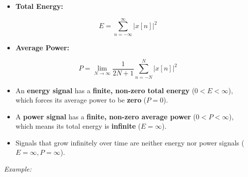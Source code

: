 \begin{itemize}
\tightlist
\item
  \textbf{Total Energy:}
\end{itemize}

\[  
E=\sum_{n=-\infty}^{\infty}|x[n]|^2  
\]

\begin{itemize}
\tightlist
\item
  \textbf{Average Power:}
\end{itemize}

\[  
P=\lim_{N\to\infty}  
\frac{1}{2N+1}  
\sum_{n=-N}^{N}|x[n]|^2  
\]

\begin{itemize}
\tightlist
\item
  An \textbf{energy signal} has a \textbf{finite, non-zero total energy}
  (\(0 < E < \infty\)), which forces its average power to be
  \textbf{zero} (\(P = 0\)).
\item
  A \textbf{power signal} has a \textbf{finite, non-zero average power}
  (\(0 < P < \infty\)), which means its total energy is
  \textbf{infinite} (\(E = \infty\)).
\item
  Signals that grow infinitely over time are neither energy nor power
  signals (\(E = \infty, P = \infty\)).
\end{itemize}

\emph{Example:}

